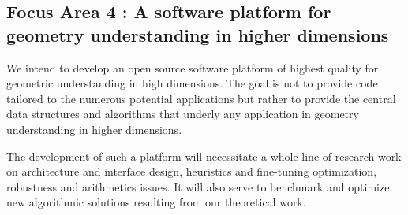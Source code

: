 
\subsection*{Focus Area 4 : A software platform for geometry understanding in higher
  dimensions}
We intend to develop an open source software platform of highest
quality %
for geometric understanding in high dimensions.  The goal
is not to provide code tailored to the numerous potential applications but
rather to provide the central data structures and algorithms that
underly any application in geometry understanding in higher
dimensions.

The development of such a
platform will necessitate a whole line of research work on architecture and
interface design, heuristics and fine-tuning optimization, robustness
and arithmetics issues. It will also serve to benchmark and optimize 
new algorithmic solutions resulting from our theoretical work. 
%
%
%
